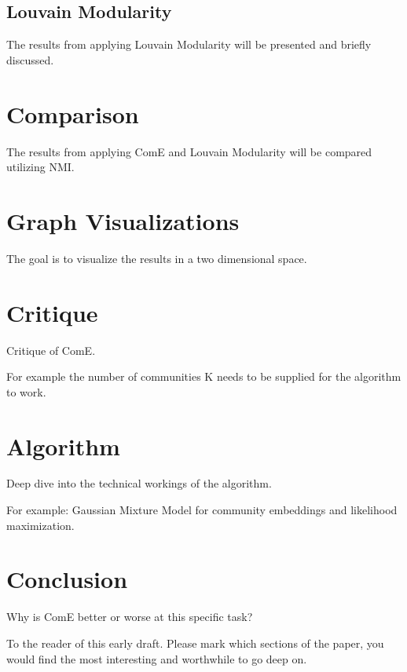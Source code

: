\documentclass[sigconf]{acmart}
\begin{document}
\subsection{Louvain Modularity}

The results from applying Louvain Modularity will be presented and briefly discussed.

\section{Comparison}

The results from applying ComE and Louvain Modularity will be compared utilizing NMI.

\section{Graph Visualizations}

The goal is to visualize the results in a two dimensional space.

\section{Critique}

Critique of ComE.

For example the number of communities K needs to be supplied for the algorithm to work.

\section{Algorithm}

Deep dive into the technical workings of the algorithm.

For example: Gaussian Mixture Model for community embeddings and likelihood maximization.

\section{Conclusion}

Why is ComE better or worse at this specific task?






\begin{acks}
To the reader of this early draft. Please mark which sections of the paper, you would find the most interesting and worthwhile to go deep on.
\end{acks}
\end{document}
